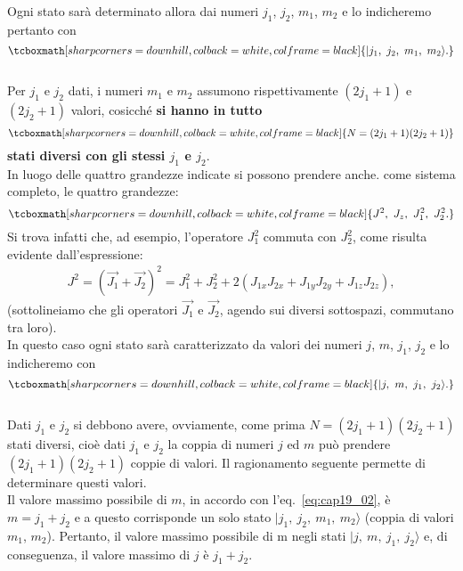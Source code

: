 Ogni stato sarà determinato allora dai numeri $j_1$, $j_2$, $m_1$, $ m_2$ e lo indicheremo pertanto con
	\begin{equation}
		\tcboxmath[sharp corners=downhill, colback=white, colframe=black]{
			| j_1 , ~ j_2 ,~ m_1 ,~ m_2 \rangle .
			}
	\end{equation}\\
	
Per $j_1$ e $j_2$ dati, i numeri $m_1$ e $m_2$ assumono rispettivamente $(2 j_1 + 1)$ e $(2 j_2 + 1)$ valori, cosicché \textbf{si hanno in tutto}
	\begin{equation} \label{eq:cap19_03}
		\tcboxmath[sharp corners=downhill, colback=white, colframe=black]{
			N= (2j_1 + 1) (2j_2 + 1) 
			}
	\end{equation}
\textbf{stati diversi con gli stessi $j_1$ e $j_2$}. \\

In luogo delle quattro grandezze indicate si possono prendere anche. come sistema completo, le quattro grandezze:
	\begin{equation}
		\tcboxmath[sharp corners=downhill, colback=white, colframe=black]{
			J^2 ,~ J_z ,~ J_1^2 ,~ J_2^2 . 
			}
	\end{equation}
Si trova infatti che, ad esempio, l'operatore $J_1^2$  commuta con $J_2^2$, come risulta evidente dall'espressione:
	\begin{align}
		J^2 = (\vec{J_1} + \vec{J_2})^2 = J_1^2 + J_2^2 + 2 (J_{1x} J_{2x} + J_{1y} J_{2y} + J_{1z} J_{2z}),
	\end{align}
(sottolineiamo che gli operatori $\vec{J_1}$ e $\vec{J_2}$, agendo sui diversi sottospazi, commutano tra loro).\\

 In questo caso ogni stato sarà caratterizzato da valori dei numeri $j$, $m$, $j_1$, $j_2$ e lo indicheremo con
	\begin{equation}
		\tcboxmath[sharp corners=downhill, colback=white, colframe=black]{
			| j ,~ m,~j_1, ~ j_2 \rangle  .
			}
	\end{equation}\\
	
Dati $j_1$ e $j_2$ si debbono avere, ovviamente, come prima $N = (2j_1+1)(2j_2+1)$ stati diversi, cioè dati $j_1$ e $j_2$ la coppia di numeri $j$ ed $m$ può prendere $(2j_1+1)(2j_2+1)$ coppie di valori. Il ragionamento seguente permette di determinare questi valori.\\

Il valore massimo possibile di $m$, in accordo con l'eq.~\eqref{eq:cap19_02}, è $m = j_1 + j_2$ e a questo corrisponde un solo stato $| j_1 ,~ j_2,~m_1, ~ m_2 \rangle $ (coppia di valori $m_1$, $m_2$). Pertanto, il valore massimo possibile di m negli stati $\mid j ,~ m,~j_1, ~ j_2 \rangle $  e, di conseguenza, il valore massimo di $j$ è $j_1 + j_2$. 

